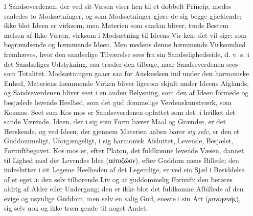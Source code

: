 \documentclass[12pt,a4paper]{book}
\newcommand{\gk}[1]{\textit{#1}}
\begin{document}
I Sandseverdenen, der ved sit Væsen viser hen til et
dobbelt Princip, mødes saaledes to Modsætninger, og som
Modsætninger gjøre de sig begge gjældende; ikke blot Ideen
er virksom, men Materien som saadan bliver, trods Bestem\-%
melsen af Ikke-Væren, virksom i Modsætning til Ideens Vir\-%
ken; det vil sige: som begrændsende og hæmmende Ideen.
Men medens denne hæmmende Virksomhed fremhæves, hvor
den sandselige Tilværelse sees fra sin Sandselighedsside, d. v. s.
i det Sandseliges Udstykning, saa træder den tilbage, naar
Sandseverdenen sees som Totalitet. Modsætningen gaaer saa
for Anskuelsen ind under den harmoniske Enhed, Materiens
hæmmende Virken bliver ligesom skjult under Ideens Afglands,
og Sandseverdenen bliver seet i en anden Belysning, som den
af Ideen formede og besjælede levende Heelhed, som det gud\-%
dommelige Verdenskunstværk, som Kosmos. Seet som Kos\-%
mos er Sandseverdenen opfattet som det, i hvilket det sande
Værende, Ideen, der i sig som Form bærer Maal og Grændse,
er det Herskende, og ved Ideen, der gjennem Materien aaben\-%
barer \emph{sig selv}, er den et Guddommeligt, Uforgængeligt, i sig
harmonisk Afsluttet, Levende, Besjælet, Fornuftbegavet. Kos\-%
mos er, efter Platon, det fuldkomne levende Væsen, dannet
til Lighed med det Levendes Idee (\gk{αὐτοζῶον}), efter Guddom\-%
mens Billede; den indeslutter i sit Legeme Heelheden af det
Legemlige, er ved sin Sjæl i Besiddelse af et eget ɔ: den selv
tilhørende Liv og af guddommelig Fornuft; den berøres aldrig
af Alder eller Undergang; den er ikke blot det fuldkomne
Afbillede af den evige og usynlige Guddom, men selv en salig
Gud, eneste i sin Art (\gk{μονογενὴς}), sig selv nok og ikke træn\-%
gende til noget Andet.
\end{document}
